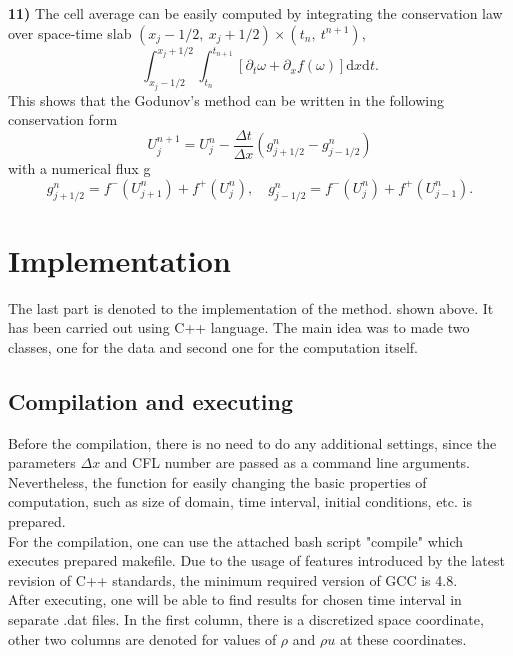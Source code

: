 \documentclass[a4paper, 10pt]{article}
\begin{document}
\textbf{11)} The cell average can be easily computed by integrating the conservation law over space-time slab $ (x_j - 1/2,\: x_j + 1/2) \times (t_{n}, \: t^{n+1}) $,
\begin{equation}
\int_{x_j - 1/2}^{x_j + 1/2} \int_{t_{n}}^{t_{n+1}} \left[ \partial_t \omega + \partial_x f\left( \omega \right)\right]  \mathrm{d}x \mathrm{d}t.
\end{equation}
This shows that the Godunov's method can be written in the following conservation form
\begin{equation}
U_{j}^{n+1} = U_j^n - \frac{\Delta t}{\Delta x} \left(g_{j + 1/2}^{n} - g_{j - 1/2}^{n} \right)
\end{equation}
with a numerical flux g
\begin{equation}
g_{j + 1/2}^{n} = f^{-}\left(U_{j+1}^{n} \right) + f^{+}\left( U_j^n\right), \quad g_{j - 1/2}^{n} = f^{-}\left(U_{j}^{n} \right) + f^{+}\left( U_{j-1}^n\right).
\end{equation}

\section{Implementation}

The last part is denoted to the implementation of the method. shown above. It has been carried out using C++ language. The main idea was to made two classes, one for the data and second one for the computation itself. 

\subsection{Compilation and executing}

Before the compilation, there is no need to do any additional settings, since the parameters $ \Delta x $ and CFL number are passed as a command line arguments. Nevertheless, the function for easily changing the basic properties of computation, such as size of domain, time interval, initial conditions, etc. is prepared.\\

For the compilation, one can use the attached bash script "compile" which executes prepared makefile. Due to the usage of features introduced by the latest revision of C++ standards, the minimum required version of GCC is 4.8.\\

After executing, one will be able to find results for chosen time interval in separate .dat files. In the first column, there is a discretized space coordinate, other two columns are denoted for values of $ \rho $ and $ \rho u $ at these coordinates.
\end{document}
